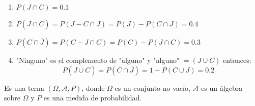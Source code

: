 \documentclass[../main.tex]{subfiles}
\begin{document}
\begin{example*}
\begin{itemize}
\begin{enumerate}[label=\alph*)]
                \item $P(J \cap C) = 0.1$
                \item $P(J \cap \overline{C}) = P(J - C \cap J) = P(J) - P(C \cap J) = 0.4$
                \item $P(C \cap \overline{J}) = P(C - J \cap C) = P(C) - P(J \cap C) = 0.3$
                \item "Ninguno" es el complemento de "alguno" y "alguno" $= (J \cup C)$ entonces:
                    \begin{equation*}
                        P(\overline{J \cup C}) = P(\overline{C} \cap \overline{J}) = 1 - P(C \cup J) = 0.2
                    \end{equation*}
            \end{enumerate}
    \end{itemize}
\end{example*}

\begin{definition}
    Es una terna $(\Omega, \mathcal{A}, P)$, donde $\Omega$ es un conjunto no vacío, $\mathcal{A}$ es un álgebra sobre $\Omega$ y $P$ es una medida de probabilidad.
\end{definition}
\end{document}
